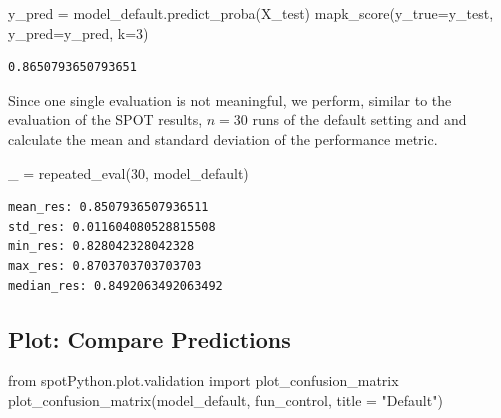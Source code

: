 \documentclass[
  letterpaper,
  DIV=11,
  numbers=noendperiod]{scrreprt}
\newenvironment{Shaded}{\begin{snugshade}}{\end{snugshade}}
\newcommand{\DecValTok}[1]{\textcolor[rgb]{0.68,0.00,0.00}{#1}}
\newcommand{\ImportTok}[1]{\textcolor[rgb]{0.00,0.46,0.62}{#1}}
\newcommand{\NormalTok}[1]{\textcolor[rgb]{0.00,0.23,0.31}{#1}}
\newcommand{\OperatorTok}[1]{\textcolor[rgb]{0.37,0.37,0.37}{#1}}
\newcommand{\StringTok}[1]{\textcolor[rgb]{0.13,0.47,0.30}{#1}}
\begin{document}
\begin{Shaded}
\begin{Highlighting}[]
\NormalTok{y\_pred }\OperatorTok{=}\NormalTok{ model\_default.predict\_proba(X\_test)}
\NormalTok{mapk\_score(y\_true}\OperatorTok{=}\NormalTok{y\_test, y\_pred}\OperatorTok{=}\NormalTok{y\_pred, k}\OperatorTok{=}\DecValTok{3}\NormalTok{)}
\end{Highlighting}
\end{Shaded}

\begin{verbatim}
0.8650793650793651
\end{verbatim}

Since one single evaluation is not meaningful, we perform, similar to
the evaluation of the SPOT results, \(n=30\) runs of the default setting
and and calculate the mean and standard deviation of the performance
metric.

\begin{Shaded}
\begin{Highlighting}[]
\NormalTok{\_ }\OperatorTok{=}\NormalTok{ repeated\_eval(}\DecValTok{30}\NormalTok{, model\_default)}
\end{Highlighting}
\end{Shaded}

\begin{verbatim}
mean_res: 0.8507936507936511
std_res: 0.011604080528815508
min_res: 0.828042328042328
max_res: 0.8703703703703703
median_res: 0.8492063492063492
\end{verbatim}

\hypertarget{plot-compare-predictions-1}{%
\subsection{Plot: Compare
Predictions}\label{plot-compare-predictions-1}}

\begin{Shaded}
\begin{Highlighting}[]
\ImportTok{from}\NormalTok{ spotPython.plot.validation }\ImportTok{import}\NormalTok{ plot\_confusion\_matrix}
\NormalTok{plot\_confusion\_matrix(model\_default, fun\_control, title }\OperatorTok{=} \StringTok{"Default"}\NormalTok{)}
\end{Highlighting}
\end{Shaded}
\end{document}
